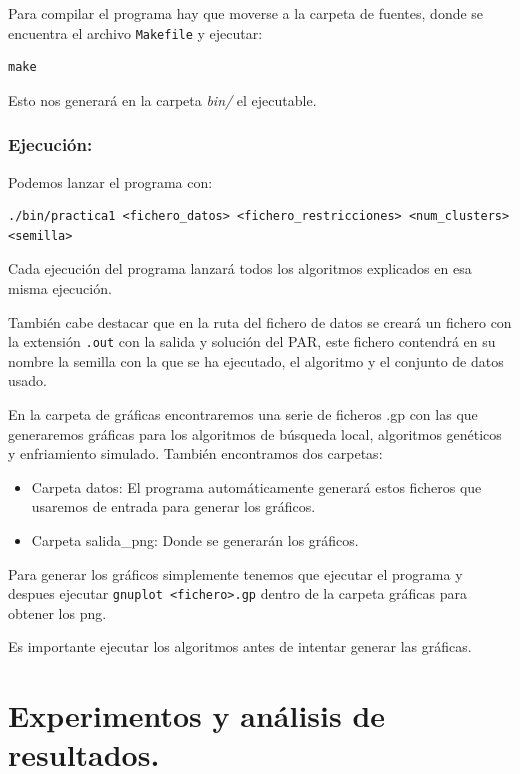 \documentclass[12pt, spanish]{article}
\begin{document}
Para compilar el programa hay que moverse a la carpeta de fuentes, donde se encuentra el archivo \texttt{Makefile} y ejecutar:

\begin{lstlisting}
make
\end{lstlisting}

Esto nos generará en la carpeta \textit{bin/} el ejecutable.




\subsubsection{Ejecución:}

Podemos lanzar el programa con:

\begin{lstlisting}
./bin/practica1 <fichero_datos> <fichero_restricciones> <num_clusters> <semilla>
\end{lstlisting}

Cada ejecución del programa lanzará todos los algoritmos explicados en esa misma ejecución.

También cabe destacar que en la ruta del fichero de datos se creará un fichero con la extensión \texttt{.out} con la salida y solución del PAR, este fichero contendrá en su nombre la semilla con la que se ha ejecutado, el algoritmo y el conjunto de datos usado.

En la carpeta de gráficas encontraremos una serie de ficheros .gp con las que generaremos gráficas para los algoritmos de búsqueda local, algoritmos genéticos y enfriamiento simulado. También encontramos dos carpetas:

\begin{itemize}
	\item Carpeta datos: El programa automáticamente generará estos ficheros que usaremos de entrada para generar los gráficos.
	\item Carpeta salida\_png: Donde se generarán los gráficos.
\end{itemize}

Para generar los gráficos simplemente tenemos que ejecutar el programa y despues ejecutar \texttt{gnuplot <fichero>.gp} dentro de la carpeta gráficas para obtener los png.


Es importante ejecutar los algoritmos antes de intentar generar las gráficas.

\newpage




\section{Experimentos y análisis de resultados.}
\end{document}
